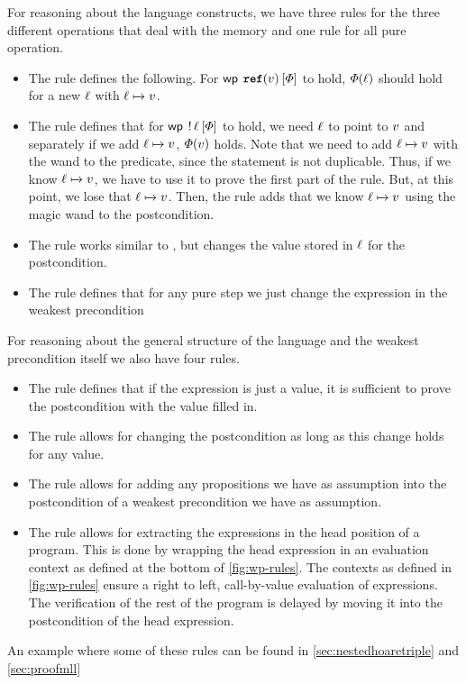 \documentclass[thesis.tex]{subfiles}
\begin{document}
For reasoning about the language constructs, we have three rules for the three different operations that deal with the memory and one rule for all pure operation.
\begin{itemize}
    \item The rule  defines the following. For $\wpre{\Alloc(\val)}{\pred}$ to hold, $\varPhi(\ell)$ should hold for a new $\ell$ with $\loc\fmapsto\val$.
    \item The rule  defines that for $\wpre{\deref \loc}{\pred}$ to hold, we need $\ell$ to point to $v$ and separately if we add $\loc\fmapsto\val$, $\varPhi(v)$ holds. Note that we need to add $\loc\fmapsto\val$ with the wand to the predicate, since the statement is not duplicable. Thus, if we know $\loc\fmapsto\val$, we have to use it to prove the first part of the  rule. But, at this point, we lose that $\loc\fmapsto\val$. Then, the  rule adds that we know $\loc\fmapsto\val$ using the magic wand to the postcondition.
    \item The rule  works similar to , but changes the value stored in $\ell$ for the postcondition.
    \item The rule  defines that for any pure step we just change the expression in the weakest precondition
\end{itemize}
For reasoning about the general structure of the language and the weakest precondition itself we also have four rules.
\begin{itemize}
    \item The rule  defines that if the expression is just a value, it is sufficient to prove the postcondition with the value filled in.
    \item The rule  allows for changing the postcondition as long as this change holds for any value.
    \item The rule  allows for adding any propositions we have as assumption into the postcondition of a weakest precondition we have as assumption.
    \item The rule  allows for extracting the expressions in the head position of a program. This is done by wrapping the head expression in an evaluation context as defined at the bottom of \cref{fig:wp-rules}. The contexts as defined in \cref{fig:wp-rules} ensure a right to left, call-by-value evaluation of expressions. The verification of the rest of the program is delayed by moving it into the postcondition of the head expression.
\end{itemize}
An example where some of these rules can be found in \cref{sec:nestedhoaretriple} and \cref{sec:proofmll}
\end{document}
